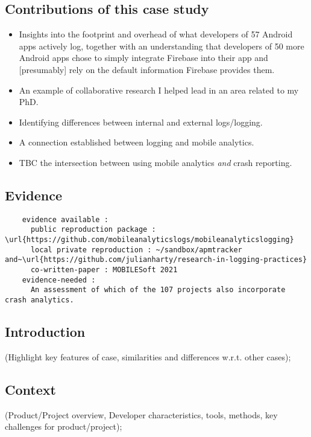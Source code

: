 \subsection*{Contributions of this case study}
\begin{itemize}
    \item Insights into the footprint and overhead of what developers of 57 Android apps actively log, together with an understanding that developers of 50 more Android apps chose to simply integrate Firebase into their app and [presumably] rely on the default information Firebase provides them.
    \item An example of collaborative research I helped lead in an area related to my PhD.
    \item Identifying differences between internal and external logs/logging.
    \item A connection established between logging and mobile analytics.
    \item TBC the intersection between using mobile analytics \textit{and} crash reporting.
\end{itemize}



\subsection*{Evidence}
  \begin{verbatim}
    evidence available :
      public reproduction package : \url{https://github.com/mobileanalyticslogs/mobileanalyticslogging}
      local private reproduction : ~/sandbox/apmtracker and~\url{https://github.com/julianharty/research-in-logging-practices}
      co-written-paper : MOBILESoft 2021
    evidence-needed : 
      An assessment of which of the 107 projects also incorporate crash analytics.
  \end{verbatim}

\subsection{Introduction}
(Highlight key features of case, similarities and differences w.r.t. other cases);


\subsection{Context}
(Product/Project overview, Developer characteristics, tools, methods, key challenges for product/project);

